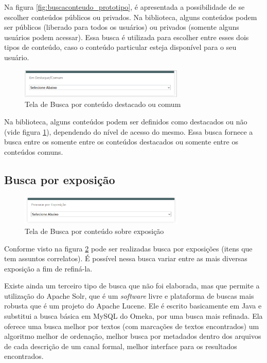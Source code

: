 Na figura \ref{fig:buscaconteudo_prototipo}, é apresentada a possibilidade de se escolher conteúdos públicos ou privados. Na biblioteca, alguns conteúdos podem ser públicos (liberado para todos os usuários) ou privados (somente alguns usuários podem acessar). Essa busca é utilizada para escolher entre esses dois tipos de conteúdo, caso o conteúdo particular esteja disponível para o seu usuário.

\graphicspath{{figuras/prototipo/}}
\begin{figure}[H]
\centering
\includegraphics[width=0.7\textwidth]{busca-destacado}
\caption{Tela de Busca por conteúdo destacado ou comum}
\label{fig:buscadestacado_prototipo}
\end{figure}

Na biblioteca, alguns conteúdos podem ser definidos como destacados ou não (vide figura \ref{fig:buscadestacado_prototipo}), dependendo do nível de acesso do mesmo. Essa busca fornece a busca entre os somente entre os conteúdos destacados ou somente entre os conteúdos comuns.

\subsection*{Busca por exposição}

\graphicspath{{figuras/prototipo/}}
\begin{figure}[H]
\centering
\includegraphics[width=0.7\textwidth]{busca-exposicao}
\caption{Tela de Busca por conteúdo sobre exposição}
\label{fig:buscaexposicao_prototipo}
\end{figure}

Conforme visto na figura \ref{fig:buscaexposicao_prototipo} pode ser realizadas busca por exposições (itens que tem assuntos correlatos). É possível nessa busca variar entre as mais diversas exposição a fim de refiná-la.

Existe ainda um terceiro tipo de busca que não foi elaborada, mas que permite a utilização do Apache Solr, que é um \textit{software} livre e plataforma de buscas mais robusta que é um projeto do Apache Lucene. Ele é escrito basicamente em Java e substitui a busca básica em MySQL do Omeka, por uma busca mais refinada. Ela oferece uma busca melhor por textos (com marcações de textos encontrados) um algoritmo melhor de ordenação, melhor busca por metadados dentro dos arquivos de cada descrição de um canal formal, melhor interface para os resultados encontrados.

